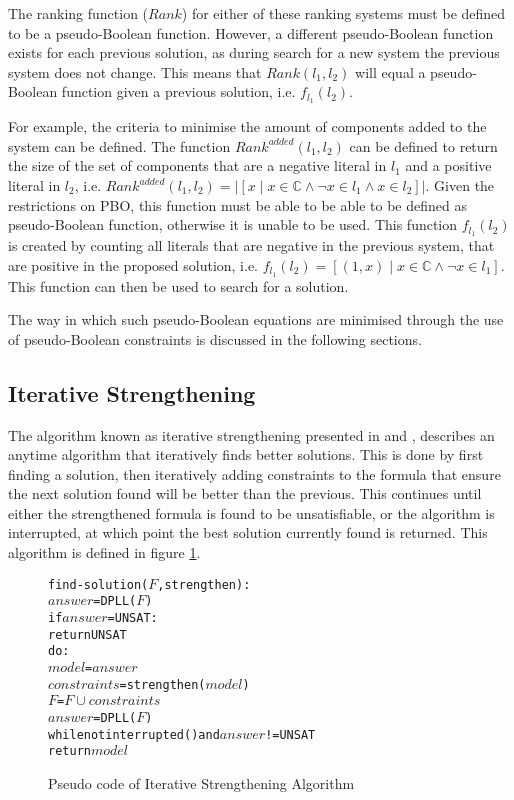 The ranking function ($Rank$) for either of these ranking systems must be defined to be a pseudo-Boolean function.
However, a different pseudo-Boolean function exists for each previous solution, as during search for a new system the previous system does not change.
This means that $Rank(l_1,l_2)$ will equal a pseudo-Boolean function given a previous solution, i.e. $f_{l_1}(l_2)$.

For example, the criteria to minimise the amount of components added to the system can be defined.
The function $Rank^{added}(l_1,l_2)$ can be defined to return the size of the set of components that are a negative literal in $l_1$ and a positive literal in $l_2$,
i.e. $Rank^{added}(l_1,l_2) = |[x \mid x \in \mathbb{C} \wedge \neg x \in l_1 \wedge x \in l_2]|$.
Given the restrictions on PBO, this function must be able to be able to be defined as pseudo-Boolean function, otherwise it is unable to be used.
This function $f_{l_1}(l_2)$ is created by counting all literals that are negative in the previous system, that are positive in the proposed solution,
i.e. $f_{l_1}(l_2) = [(1, x) \mid x \in \mathbb{C} \wedge \neg x \in l_1]$.
This function can then be used to search for a solution.

The way in which such pseudo-Boolean equations are minimised through the use of pseudo-Boolean constraints is discussed in the following sections. 


\subsection{Iterative Strengthening}
The algorithm known as iterative strengthening presented in \citep{calistri1994iterative} and \citep{le2010sat4j}, 
describes an anytime algorithm that iteratively finds better solutions.
This is done by first finding a solution, then iteratively adding constraints to the formula that ensure the next solution found will be better than the previous.
This continues until either the strengthened formula is found to be unsatisfiable, or the algorithm is interrupted, at which point the best solution currently found is returned. 
This algorithm is defined in figure \ref{impl.strength}.

\begin{figure}[htp]
\begin{center}
\begin{alltt}
find-solution(\(F\),strengthen):
    \(answer\) = DPLL(\(F\))
    if \(answer\) = UNSAT:
        return UNSAT
    do:
        \(model\) = \(answer\)
        \(constraints\) = strengthen(\(model\))
        \(F\) = \(F \cup constraints\)
        \(answer\) = DPLL(\(F\))
    while not interrupted() and \(answer\) != UNSAT
    return \(model\) 
\end{alltt}
  \caption{Pseudo code of Iterative Strengthening Algorithm}
  \label{impl.strength}
\end{center}
\end{figure}

